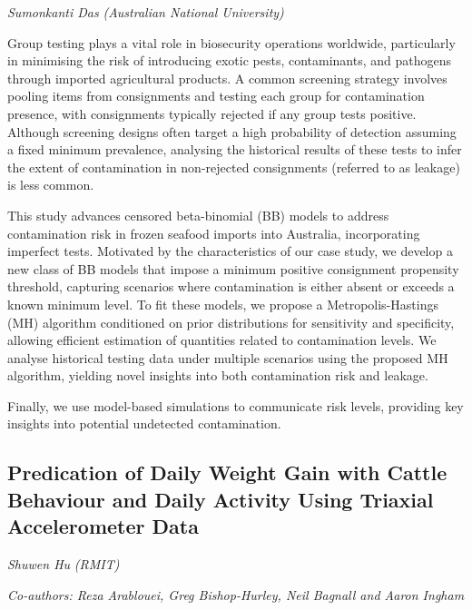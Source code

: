 \documentclass[
]{scrreprt}
\begin{document}
\emph{Sumonkanti Das} \emph{(Australian National
University)}

\setlength{\parskip}{0.5em}

Group testing plays a vital role in biosecurity operations worldwide,
particularly in minimising the risk of introducing exotic pests,
contaminants, and pathogens through imported agricultural products. A
common screening strategy involves pooling items from consignments and
testing each group for contamination presence, with consignments
typically rejected if any group tests positive. Although screening
designs often target a high probability of detection assuming a fixed
minimum prevalence, analysing the historical results of these tests to
infer the extent of contamination in non-rejected consignments (referred
to as leakage) is less common.

This study advances censored beta-binomial (BB) models to address
contamination risk in frozen seafood imports into Australia,
incorporating imperfect tests. Motivated by the characteristics of our
case study, we develop a new class of BB models that impose a minimum
positive consignment propensity threshold, capturing scenarios where
contamination is either absent or exceeds a known minimum level. To fit
these models, we propose a Metropolis-Hastings (MH) algorithm
conditioned on prior distributions for sensitivity and specificity,
allowing efficient estimation of quantities related to contamination
levels. We analyse historical testing data under multiple scenarios
using the proposed MH algorithm, yielding novel insights into both
contamination risk and leakage.

Finally, we use model-based simulations to communicate risk levels,
providing key insights into potential undetected contamination.

\subsection{Predication of Daily Weight Gain with Cattle Behaviour and
Daily Activity Using Triaxial Accelerometer
Data}\label{predication-of-daily-weight-gain-with-cattle-behaviour-and-daily-activity-using-triaxial-accelerometer-data}

\emph{Shuwen Hu} \emph{(RMIT)}

\emph{Co-authors: Reza Arablouei, Greg Bishop-Hurley, Neil Bagnall and
Aaron Ingham}

\setlength{\parskip}{0.5em}
\end{document}
